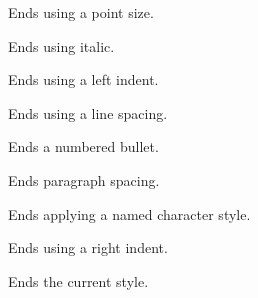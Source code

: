 \label{wxrichtextbufferendfontsize}


Ends using a point size.

\label{wxrichtextbufferenditalic}


Ends using italic.

\label{wxrichtextbufferendleftindent}


Ends using a left indent.

\label{wxrichtextbufferendlinespacing}


Ends using a line spacing.

\label{wxrichtextbufferendnumberedbullet}


Ends a numbered bullet.

\label{wxrichtextbufferendparagraphspacing}


Ends paragraph spacing.

\label{wxrichtextbufferendparagraphstyle}


Ends applying a named character style.

\label{wxrichtextbufferendrightindent}


Ends using a right indent.

\label{wxrichtextbufferendstyle}


Ends the current style.

\label{wxrichtextbufferendsuppressundo}



